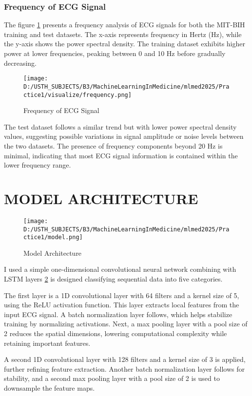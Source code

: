 \documentclass[10pt, conference]{IEEEtran}
\begin{document}
	\subsubsection{Frequency of ECG Signal}
	The figure \ref{fig:frequency} presents a frequency analysis of ECG signals for both the MIT-BIH training and test datasets. The x-axis represents frequency in Hertz (Hz), while the y-axis shows the power spectral density. The training dataset exhibits higher power at lower frequencies, peaking between 0 and 10 Hz before gradually decreasing.
	
	\begin{figure}[H]
		\centering
		\texttt{[image: D:/USTH\_SUBJECTS/B3/MachineLearningInMedicine/mlmed2025/Practice1/visualize/frequency.png]}
		\caption{Frequency of ECG Signal}
		\label{fig:frequency}
	\end{figure}
	
	The test dataset follows a similar trend but with lower power spectral density values, suggesting possible variations in signal amplitude or noise levels between the two datasets. The presence of frequency components beyond 20 Hz is minimal, indicating that most ECG signal information is contained within the lower frequency range.
	
	\section{\textbf{M}ODEL ARCHITECTURE}
	
	\begin{figure}[H]
		\centering
		\texttt{[image: D:/USTH\_SUBJECTS/B3/MachineLearningInMedicine/mlmed2025/Practice1/model.png]}
		\caption{Model Architecture}
		\label{fig:archihtecture}
	\end{figure}
	
	I used a simple one-dimensional convolutional neural network combining with LSTM layers \ref{fig:archihtecture} is designed classifying sequential data into five categories.
	
	The first layer is a 1D convolutional layer with 64 filters and a kernel size of 5, using the ReLU activation function. This layer extracts local features from the input ECG signal. A batch normalization layer follows, which helps stabilize training by normalizing activations. Next, a max pooling layer with a pool size of 2 reduces the spatial dimensions, lowering computational complexity while retaining important features.
	
	A second 1D convolutional layer with 128 filters and a kernel size of 3 is applied, further refining feature extraction. Another batch normalization layer follows for stability, and a second max pooling layer with a pool size of 2 is used to downsample the feature maps.
	
\end{document}

